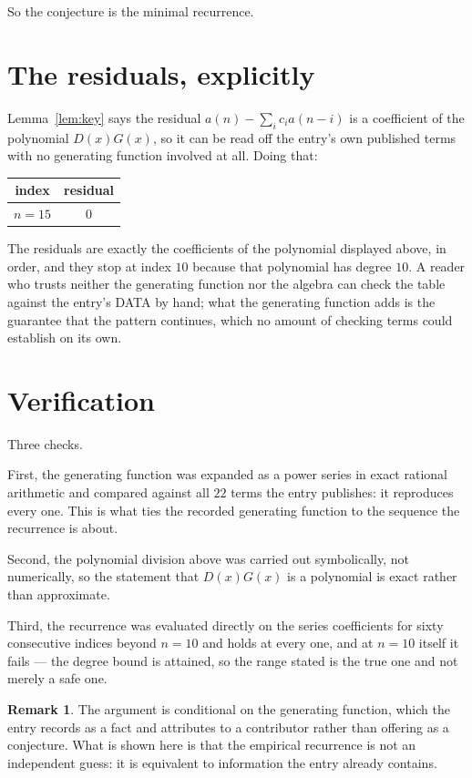 \documentclass[11pt,a4paper]{article}
\theoremstyle{plain}
\theoremstyle{definition}
\newtheorem{remark}[theorem]{Remark}
\begin{document}
So the conjecture is the minimal recurrence.

\section{The residuals, explicitly}

Lemma~\ref{lem:key} says the residual $a(n)-\sum_ic_ia(n-i)$ is a coefficient of the
polynomial $D(x)G(x)$, so it can be read off the entry's own published terms with no
generating function involved at all. Doing that:
\begin{center}
\begin{tabular}{cc}
index & residual \\ \hline
$n=15$ & $0$
\end{tabular}
\end{center}
The residuals are exactly the coefficients of the polynomial displayed above, in order, and
they stop at index $10$ because that polynomial has degree $10$. A reader who trusts
neither the generating function nor the algebra can check the table against the entry's DATA
by hand; what the generating function adds is the guarantee that the pattern continues, which
no amount of checking terms could establish on its own.

\section{Verification}

Three checks.

First, the generating function was expanded as a power series in exact rational arithmetic and
compared against all $22$ terms the entry publishes: it reproduces every one. This is
what ties the recorded generating function to the sequence the recurrence is about.

Second, the polynomial division above was carried out symbolically, not numerically, so the
statement that $D(x)G(x)$ is a polynomial is exact rather than approximate.

Third, the recurrence was evaluated directly on the series coefficients for sixty consecutive
indices beyond $n=10$ and holds at every one, and at $n=10$ itself it fails --- the
degree bound is attained, so the range stated is the true one and not merely a safe one.

\begin{remark}
The argument is conditional on the generating function, which the entry records as a fact and
attributes to a contributor rather than offering as a conjecture. What is shown here is that
the empirical recurrence is not an independent guess: it is equivalent to information the
entry already contains.
\end{remark}
\end{document}
